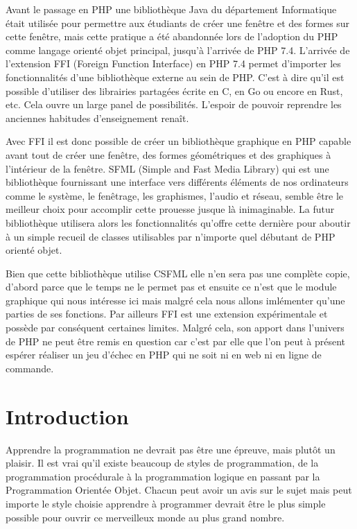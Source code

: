 \documentclass[11pt,a4paper,krantz2,11pt,oneside]{krantz}
\begin{document}
Avant le passage en PHP une bibliothèque Java du département Informatique était utilisée pour permettre aux étudiants de créer une fenêtre et des formes sur cette fenêtre, mais cette pratique a été abandonnée lors de l'adoption du PHP comme langage orienté objet principal, jusqu'à l'arrivée de PHP 7.4. L'arrivée de l'extension FFI (Foreign Function Interface) en PHP 7.4 permet d'importer les fonctionnalités d'une bibliothèque externe au sein de PHP. C'est à dire qu'il est possible d'utiliser des librairies partagées écrite en C, en Go ou encore en Rust, etc. Cela ouvre un large panel de possibilités. L'espoir de pouvoir reprendre les anciennes habitudes d'enseignement renaît.

Avec FFI il est donc possible de créer un bibliothèque graphique en PHP capable avant tout de créer une fenêtre, des formes géométriques et des graphiques à l'intérieur de la fenêtre. SFML (Simple and Fast Media Library) qui est une bibliothèque fournissant une interface vers différents éléments de nos ordinateurs comme le système, le fenêtrage, les graphismes, l'audio et réseau, semble être le meilleur choix pour accomplir cette prouesse jusque là inimaginable. La futur bibliothèque utilisera alors les fonctionnalités qu'offre cette dernière pour aboutir à un simple recueil de classes utilisables par n'importe quel débutant de PHP orienté objet.

Bien que cette bibliothèque utilise CSFML elle n'en sera pas une complète copie, d'abord parce que le temps ne le permet pas et ensuite ce n'est que le module graphique qui nous intéresse ici mais malgré cela nous allons imlémenter qu'une parties de ses fonctions. Par ailleurs FFI est une extension expérimentale et possède par conséquent certaines limites. Malgré cela, son apport dans l'univers de PHP ne peut être remis en question car c'est par elle que l'on peut à présent espérer réaliser un jeu d'échec en PHP qui ne soit ni en web ni en ligne de commande.

\hypertarget{intro}{%
\chapter*{Introduction}\label{intro}}


Apprendre la programmation ne devrait pas être une épreuve, mais plutôt un plaisir. Il est vrai qu'il existe beaucoup de styles de programmation, de la programmation procédurale à la programmation logique en passant par la Programmation Orientée Objet. Chacun peut avoir un avis sur le sujet mais peut importe le style choisie apprendre à programmer devrait être le plus simple possible pour ouvrir ce merveilleux monde au plus grand nombre.
\end{document}
